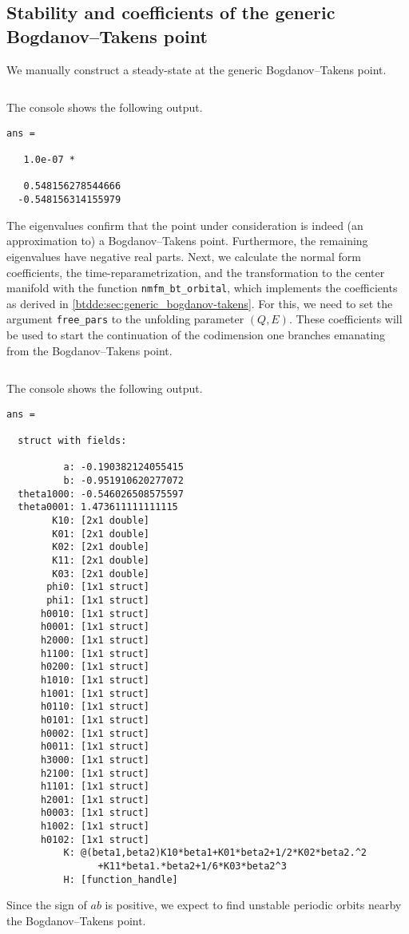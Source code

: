 \subsection{Stability and coefficients of the generic Bogdanov--Takens point}
We manually construct a steady-state at the generic Bogdanov--Takens point.
\inputminted[firstline=46, lastline=56]{MATLAB}{\pathToDDEBifToolDemos/neural_network_model/neural_network_model.m}
The \MATLAB console shows the following output.
\begin{verbatim}
ans =

   1.0e-07 *

   0.548156278544666
  -0.548156314155979
\end{verbatim}
The eigenvalues confirm that the point under consideration is indeed (an
approximation to) a Bogdanov--Takens point. Furthermore, the remaining eigenvalues have
negative real parts. Next, we calculate the normal form coefficients, the
time-reparametrization, and the transformation to the center manifold with the
function \texttt{nmfm_bt_orbital}, which implements the coefficients as derived in
\cref{btdde:sec:generic_bogdanov-takens}. For this, we need to set the argument
\texttt{free_pars} to the unfolding parameter $(Q,E)$. These
coefficients will be used to start the continuation of the codimension one branches
emanating from the Bogdanov--Takens point.
\inputminted[firstline=58, lastline=62]{MATLAB}{\pathToDDEBifToolDemos/neural_network_model/neural_network_model.m}
The \MATLAB console shows the following output.
\begin{verbatim}
ans =

  struct with fields:

          a: -0.190382124055415
          b: -0.951910620277072
  theta1000: -0.546026508575597
  theta0001: 1.473611111111115
        K10: [2x1 double]
        K01: [2x1 double]
        K02: [2x1 double]
        K11: [2x1 double]
        K03: [2x1 double]
       phi0: [1x1 struct]
       phi1: [1x1 struct]
      h0010: [1x1 struct]
      h0001: [1x1 struct]
      h2000: [1x1 struct]
      h1100: [1x1 struct]
      h0200: [1x1 struct]
      h1010: [1x1 struct]
      h1001: [1x1 struct]
      h0110: [1x1 struct]
      h0101: [1x1 struct]
      h0002: [1x1 struct]
      h0011: [1x1 struct]
      h3000: [1x1 struct]
      h2100: [1x1 struct]
      h1101: [1x1 struct]
      h2001: [1x1 struct]
      h0003: [1x1 struct]
      h1002: [1x1 struct]
      h0102: [1x1 struct]
          K: @(beta1,beta2)K10*beta1+K01*beta2+1/2*K02*beta2.^2
                +K11*beta1.*beta2+1/6*K03*beta2^3
          H: [function_handle]
\end{verbatim}
Since the sign of $ab$ is positive, we expect to find unstable periodic orbits nearby the 
Bogdanov--Takens point.

